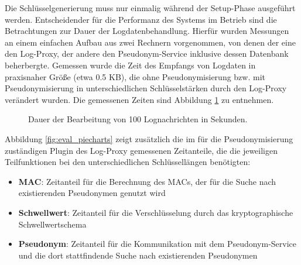 Die Schlüsselgenerierung muss nur einmalig während der Setup-Phase ausgeführt werden. Entscheidender für die Performanz des Systems im Betrieb sind die Betrachtungen zur Dauer der Logdatenbehandlung. Hierfür wurden Messungen an einem einfachen Aufbau aus zwei Rechnern vorgenommen, von denen der eine den Log-Proxy, der andere den Pseudonym-Service inklusive dessen Datenbank beherbergte. Gemessen wurde die Zeit des Empfangs von Logdaten in praxisnaher Größe (etwa 0.5 KB), die ohne Pseudonymisierung bzw. mit Pseudonymisierung in unterschiedlichen Schlüsselstärken durch den Log-Proxy verändert wurden. Die gemessenen Zeiten sind Abbildung \ref{fig:eval_barchart} zu entnehmen.

\begin{figure}[]
    \centering
    \caption{Dauer der Bearbeitung von 100 Lognachrichten in Sekunden.}
    \label{fig:eval_barchart}
\end{figure}

Abbildung \ref{fig:eval_piecharts} zeigt zusätzlich die im für die Pseudonymisierung zuständigen Plugin des Log-Proxy gemessenen Zeitanteile, die die jeweiligen Teilfunktionen bei den unterschiedlichen Schlüssellängen benötigten:
\begin{itemize}
  \item \textbf{MAC}: Zeitanteil für die Berechnung des MACs, der für die Suche nach existierenden Pseudonymen genutzt wird %
  \item \textbf{Schwellwert}: Zeitanteil für die Verschlüsselung durch das kryptographische Schwellwertschema %
  \item \textbf{Pseudonym}: Zeitanteil für die Kommunikation mit dem Pseudonym-Service und die dort stattfindende Suche nach existierenden Pseudonymen
\end{itemize} 

